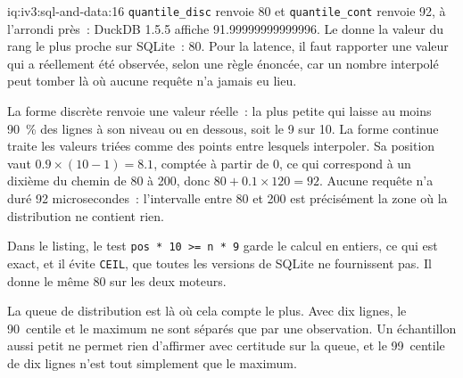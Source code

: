 \begin{solution}{iq:iv3:sql-and-data:16}
\texttt{quantile\_disc} renvoie 80 et \texttt{quantile\_cont} renvoie 92, à l'arrondi près~: DuckDB 1.5.5 affiche 91.99999999999996. Le  donne la valeur du rang le plus proche sur SQLite~: 80. Pour la latence, il faut rapporter une valeur qui a réellement été observée, selon une règle énoncée, car un nombre interpolé peut tomber là où aucune requête n'a jamais eu lieu.
\label{lst:iv3:sq:rank}

La forme discrète renvoie une valeur réelle~: la plus petite qui laisse au moins 90~\% des lignes à son niveau ou en dessous, soit le 9 sur 10. La forme continue traite les valeurs triées comme des points entre lesquels interpoler. Sa position vaut $0.9 \times (10 - 1) = 8.1$, comptée à partir de 0, ce qui correspond à un dixième du chemin de 80 à 200, donc $80 + 0.1 \times 120 = 92$. Aucune requête n'a duré 92 microsecondes~: l'intervalle entre 80 et 200 est précisément la zone où la distribution ne contient rien.

Dans le listing, le test \texttt{pos * 10 >= n * 9} garde le calcul en entiers, ce qui est exact, et il évite \texttt{CEIL}, que toutes les versions de SQLite ne fournissent pas. Il donne le même 80 sur les deux moteurs.

La queue de distribution est là où cela compte le plus. Avec dix lignes, le 90~centile et le maximum ne sont séparés que par une observation. Un échantillon aussi petit ne permet rien d'affirmer avec certitude sur la queue, et le 99~centile de dix lignes n'est tout simplement que le maximum.

\end{solution}

